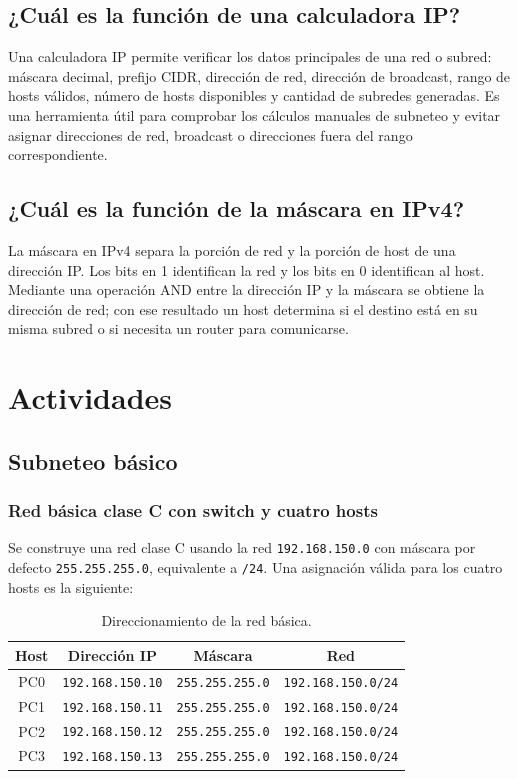 \documentclass[a4paper,12pt]{article}
\newcommand{\ip}[1]{\mbox{\texttt{#1}}}
\begin{document}
\subsection{¿Cuál es la función de una calculadora IP?}

Una calculadora IP permite verificar los datos principales de una red o subred: máscara decimal, prefijo CIDR, dirección de red, dirección de broadcast, rango de hosts válidos, número de hosts disponibles y cantidad de subredes generadas. Es una herramienta útil para comprobar los cálculos manuales de subneteo y evitar asignar direcciones de red, broadcast o direcciones fuera del rango correspondiente.

\subsection{¿Cuál es la función de la máscara en IPv4?}

La máscara en IPv4 separa la porción de red y la porción de host de una dirección IP. Los bits en 1 identifican la red y los bits en 0 identifican al host. Mediante una operación AND entre la dirección IP y la máscara se obtiene la dirección de red; con ese resultado un host determina si el destino está en su misma subred o si necesita un router para comunicarse.

\section{Actividades}

\subsection{Subneteo básico}

\subsubsection{Red básica clase C con switch y cuatro hosts}

Se construye una red clase C usando la red \ip{192.168.150.0} con máscara por defecto \ip{255.255.255.0}, equivalente a \ip{/24}. Una asignación válida para los cuatro hosts es la siguiente:

\begin{table}[H]
\centering
\begin{tabular}{|c|c|c|c|}
\hline
Host & Dirección IP & Máscara & Red \\
\hline
PC0 & \ip{192.168.150.10} & \ip{255.255.255.0} & \ip{192.168.150.0/24} \\
PC1 & \ip{192.168.150.11} & \ip{255.255.255.0} & \ip{192.168.150.0/24} \\
PC2 & \ip{192.168.150.12} & \ip{255.255.255.0} & \ip{192.168.150.0/24} \\
PC3 & \ip{192.168.150.13} & \ip{255.255.255.0} & \ip{192.168.150.0/24} \\
\hline
\end{tabular}
\caption{Direccionamiento de la red básica.}
\end{table}
\end{document}
